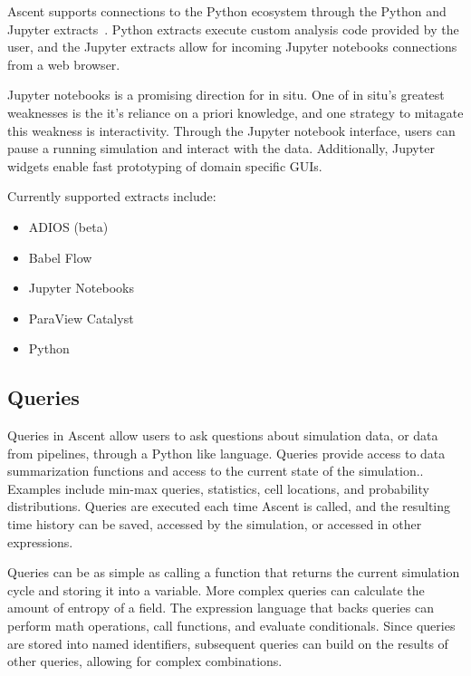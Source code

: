 Ascent supports connections to the Python ecosystem through the Python and
Jupyter extracts~\cite{CyrusISAV,Jupyter}.
%
Python extracts execute custom analysis code provided by the user, and the
Jupyter extracts allow for incoming Jupyter notebooks connections from a web
browser.

Jupyter notebooks is a promising direction for in situ.
%
One of in situ's greatest weaknesses is the it's reliance on a priori
knowledge, and one strategy to mitagate this weakness is interactivity.
%
Through the Jupyter notebook interface, users can pause a running simulation
and interact with the data.
%
Additionally, Jupyter widgets enable fast prototyping of domain specific
GUIs.

Currently supported extracts include:
\begin{itemize}
\item ADIOS (beta)
\item Babel Flow~\cite{babelflow}
\item Jupyter Notebooks
\item ParaView Catalyst
\item Python
\end{itemize}

\subsection{Queries}
\label{action_queries}
Queries in Ascent allow users to ask questions about simulation data,
or data from pipelines, through a Python like language.
%
Queries provide access to data summarization functions and access to the
current state of the simulation..
%
Examples include min-max queries, statistics, cell locations,
and probability distributions.
%
Queries are executed each time Ascent is called, and the resulting time
history can be saved, accessed by the simulation, or accessed in other
expressions.

Queries can be as simple as calling a function that returns the current simulation cycle
and storing it into a variable.
%
More complex queries can calculate the amount of entropy of a field.
%
The expression language that backs queries can perform math operations,
call functions, and evaluate conditionals.
%
Since queries are stored into named identifiers, subsequent queries
can build on the results of other queries, allowing for complex combinations.


